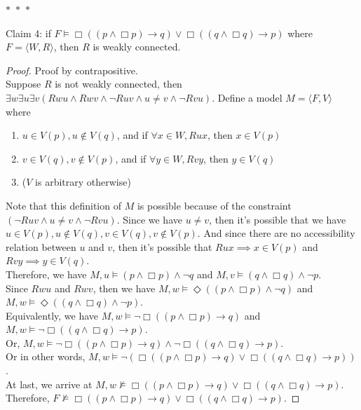 \documentclass[12pt]{article}
\newcommand{\B}{\Box}
\newcommand{\D}{\Diamond}
\newcommand{\s}{\vDash}
\newcommand{\ns}{\nvDash}
\begin{document}
\noindent
\begin{center}
    $\ast$~$\ast$~$\ast$
\end{center}
Claim 4: if $F \vDash \B((p \land \B p) \to q) \lor \B((q \land \B q) \to p)$ where $F = \langle W, R \rangle$, then $R$ is weakly connected. 
\begin{proof} Proof by contrapositive.\\
    Suppose $R$ is not weakly connected, then $\exists w \exists u \exists v (Rwu \land Rwv \land \neg Ruv \land u \neq v \land \neg Rvu)$.
    Define a model $M = \langle F, V \rangle$ where
    \begin{enumerate}
        \item $u \in V(p), u \notin V(q)$, and if $\forall x \in W, Rux$, then $x \in V(p)$
        \item $v \in V(q), v \notin V(p)$, and if $\forall y \in W, Rvy$, then $y \in V(q)$
        \item ($V$ is arbitrary otherwise)
    \end{enumerate}
    Note that this definition of $M$ is possible because of the constraint $(\neg Ruv \land u \neq v \land \neg Rvu)$.
    Since we have $u \neq v$, then it's possible that we have $u \in V(p), u \notin V(q), v \in V(q), v \notin V(p)$.
    And since there are no accessibility relation between $u$ and $v$, then it's possible that $Rux \implies x \in V(p)$ and $Rvy \implies y \in V(q)$.\\
    Therefore, we have $M, u \s (p \land \B p) \land \neg q$ and $M, v \s (q \land \B q) \land \neg p$.\\
    Since $Rwu$ and $Rwv$, then we have $M, w \s \D ((p \land \B p) \land \neg q)$ and $M, w \s \D ((q \land \B q) \land \neg p)$.\\
    Equivalently, we have $M, w \s \neg \B ((p \land \B p) \to q)$ and $M, w \s \neg \B ((q \land \B q) \to p)$.\\
    Or, $M, w \s \neg \B ((p \land \B p) \to q) \land \neg \B ((q \land \B q) \to p)$.\\
    Or in other words, $M, w \s \neg(\B ((p \land \B p) \to q) \lor \B ((q \land \B q) \to p))$.\\
    At last, we arrive at $M, w \ns \B ((p \land \B p) \to q) \lor \B ((q \land \B q) \to p)$.\\
    Therefore, $F \ns \B ((p \land \B p) \to q) \lor \B ((q \land \B q) \to p)$.

\end{proof}
\end{document}
